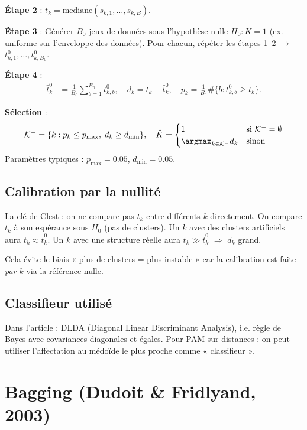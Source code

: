 \documentclass[11pt, a4paper]{article}
\begin{document}
\textbf{Étape 2} : $t_k = \text{mediane}(s_{k,1}, \ldots, s_{k,B})$.

\textbf{Étape 3} : Générer $B_0$ jeux de données sous l'hypothèse nulle $H_0 : K=1$ (ex. uniforme sur l'enveloppe des données). Pour chacun, répéter les étapes 1--2 $\to$ $t_{k,1}^0, \ldots, t_{k,B_0}^0$.

\textbf{Étape 4} :
\begin{align*}
  \bar{t}_k^0 &= \frac{1}{B_0}\sum_{b=1}^{B_0} t_{k,b}^0, \quad
  d_k = t_k - \bar{t}_k^0, \quad
  p_k = \frac{1}{B_0}\#\{b : t_{k,b}^0 \geq t_k\}.
\end{align*}

\textbf{Sélection} :
\[
  \mathcal{K}^- = \{k : p_k \leq p_{\max},\; d_k \geq d_{\min}\}, \quad
  \hat{K} = \begin{cases} 1 & \text{si } \mathcal{K}^- = \emptyset \\ \argmax_{k \in \mathcal{K}^-} d_k & \text{sinon} \end{cases}
\]
Paramètres typiques : $p_{\max}=0.05$, $d_{\min}=0.05$.

\subsection{Calibration par la nullité}

La clé de Clest : on ne compare pas $t_k$ entre différents $k$ directement. On compare $t_k$ à son espérance sous $H_0$ (pas de clusters). Un $k$ avec des clusters artificiels aura $t_k \approx \bar{t}_k^0$. Un $k$ avec une structure réelle aura $t_k \gg \bar{t}_k^0$ $\Rightarrow$ $d_k$ grand.

Cela évite le biais « plus de clusters = plus instable » car la calibration est faite \emph{par $k$} via la référence nulle.

\subsection{Classifieur utilisé}

Dans l'article : DLDA (Diagonal Linear Discriminant Analysis), i.e. règle de Bayes avec covariances diagonales et égales. Pour PAM sur distances : on peut utiliser l'affectation au médoïde le plus proche comme « classifieur ».

\section{Bagging (Dudoit \& Fridlyand, 2003)}
\end{document}
